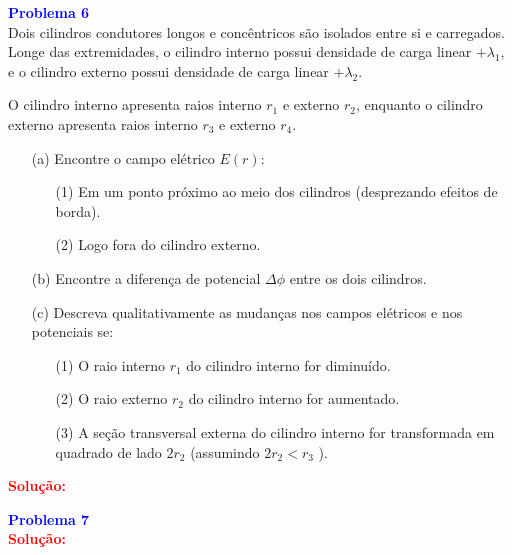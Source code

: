 \documentclass[a4paper,12pt]{article}
\begin{document}
\begin{flushleft}
\textbf{\textcolor{blue}{\Large Problema 6}}\\

Dois cilindros condutores longos e concêntricos são isolados entre si e carregados. Longe das extremidades, 
o cilindro interno possui densidade de carga linear \( +\lambda_1 \), e o cilindro externo possui densidade de 
carga linear \( +\lambda_2 \).

O cilindro interno apresenta raios interno \( r_1 \) e externo \( r_2 \), enquanto o cilindro externo apresenta raios interno \( r_3 \) e externo \( r_4 \).

\begin{enumerate}
    \item[(a)] Encontre o campo elétrico \( E(r) \):
    \begin{enumerate}
        \item[(1)] Em um ponto próximo ao meio dos cilindros (desprezando efeitos de borda).
        \item[(2)] Logo fora do cilindro externo.
    \end{enumerate}

    \item[(b)] Encontre a diferença de potencial $\Delta\phi$ entre os dois cilindros.

    \item[(c)] Descreva qualitativamente as mudanças nos campos elétricos e nos potenciais se:
    \begin{enumerate}
        \item[(1)] O raio interno \( r_1 \) do cilindro interno for diminuído.
        \item[(2)] O raio externo \( r_2 \) do cilindro interno for aumentado.
        \item[(3)] A seção transversal externa do cilindro interno for transformada em
                   quadrado de lado \( 2r_2 \) (assumindo \( 2r_2 < r_3 \) ).
    \end{enumerate}
\end{enumerate}

\textcolor{red}{\textbf{Solução:}}\\
\end{flushleft}

\begin{flushleft}
\textbf{\textcolor{blue}{\Large Problema 7}}\\

\textcolor{red}{\textbf{Solução:}}\\
\end{flushleft}
\end{document}
